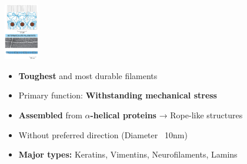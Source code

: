\begin{minipage}{0.15\linewidth}
    \includegraphics[width=15mm]{src/Images/interm_fil.png}
\end{minipage}
\begin{minipage}{0.85\linewidth}
\begin{itemize}
    \item \textbf{Toughest} and most durable filaments
    \item Primary function: \textbf{Withstanding mechanical stress}
    \item \textbf{Assembled} from \textbf{$\alpha$-helical proteins} → Rope-like structures
    \item Without preferred direction (Diameter ~10nm)
    \item \textbf{Major types:} Keratins, Vimentins, Neurofilaments, Lamins
\end{itemize}
\end{minipage}